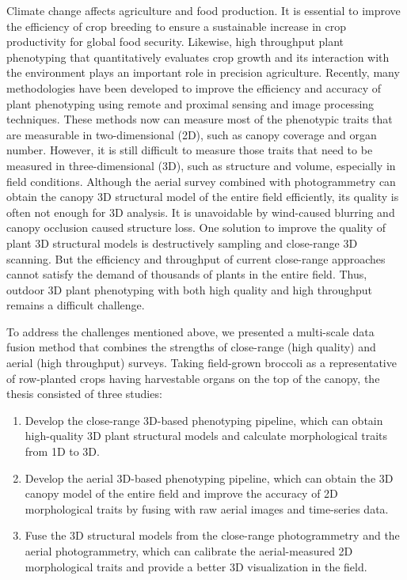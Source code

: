 \begin{doublespace}
Climate change affects agriculture and food production. It is essential to improve the efficiency of crop breeding to ensure a sustainable increase in crop productivity for global food security. Likewise, high throughput plant phenotyping that quantitatively evaluates crop growth and its interaction with the environment plays an important role in precision agriculture. Recently, many methodologies have been developed to improve the efficiency and accuracy of plant phenotyping using remote and proximal sensing and image processing techniques. These methods now can measure most of the phenotypic traits that are measurable in two-dimensional (2D), such as canopy coverage and organ number. However, it is still difficult to measure those traits that need to be measured in three-dimensional (3D), such as structure and volume, especially in field conditions. Although the aerial survey combined with photogrammetry can obtain the canopy 3D structural model of the entire field efficiently, its quality is often not enough for 3D analysis. It is unavoidable by wind-caused blurring and canopy occlusion caused structure loss. One solution to improve the quality of plant 3D structural models is destructively sampling and close-range 3D scanning. But the efficiency and throughput of current close-range approaches cannot satisfy the demand of thousands of plants in the entire field. Thus, outdoor 3D plant phenotyping with both high quality and high throughput remains a difficult challenge.

To address the challenges mentioned above, we presented a multi-scale data fusion method that combines the strengths of close-range (high quality) and aerial (high throughput) surveys. Taking field-grown broccoli as a representative of row-planted crops having harvestable organs on the top of the canopy, the thesis consisted of three studies: 

\begin{enumerate}
  \item Develop the close-range 3D-based phenotyping pipeline, which can obtain high-quality 3D plant structural models and calculate morphological traits from 1D to 3D.
  \item Develop the aerial 3D-based phenotyping pipeline, which can obtain the 3D canopy model of the entire field and improve the accuracy of 2D morphological traits by fusing with raw aerial images and time-series data.
  \item Fuse the 3D structural models from the close-range photogrammetry and the aerial photogrammetry, which can calibrate the aerial-measured 2D morphological traits and provide a better 3D visualization in the field.
\end{enumerate}


\end{doublespace}
